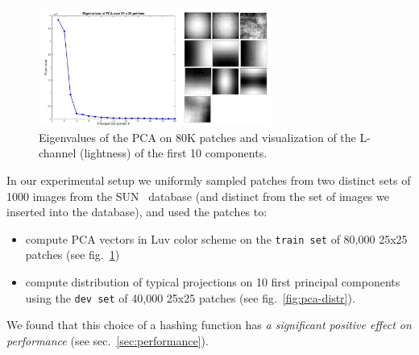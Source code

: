 \begin{figure}[ht!]
\includegraphics[width=3.0in]{fig_NN/principal_comps.png}
\caption{Eigenvalues of the PCA on 80K patches and visualization
of the L-channel (lightness) of the first 10 components.}
\label{fig:lambdas}
\end{figure}

In our experimental setup we uniformly sampled patches from two distinct
sets of 1000 images from the SUN~\cite{SUN} database
(and distinct from the set of images we inserted into the database),
and used the patches to:
\begin{itemize}
\item compute PCA vectors in Luv color scheme on the \texttt{train{\allowbreak} set}
of 80,000 25x25 patches (see fig.~\ref{fig:lambdas})
\item compute distribution of typical projections on 10
first principal components using the \texttt{dev{\allowbreak} set} of
40,000 25x25 patches (see fig.~\ref{fig:pca-distr}).
\end{itemize}
We found that this choice of a hashing function has \emph{a
significant positive effect on performance} (see sec.~\ref{sec:performance}).


